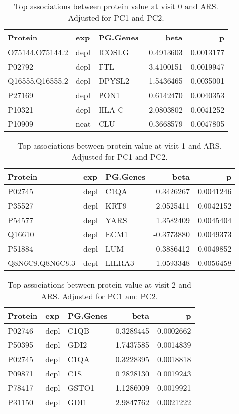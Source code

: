 \documentclass[
]{article}
\begin{document}
\begin{table}

\caption{\label{tab:v0}Top associations between protein value at visit 0 and ARS. Adjusted for PC1 and PC2.}
\centering
\begin{tabular}[t]{l|l|l|r|r}
\hline
Protein & exp & PG.Genes & beta & p\\
\hline
O75144.O75144.2 & depl & ICOSLG & 0.4913603 & 0.0013177\\
\hline
P02792 & depl & FTL & 3.4100151 & 0.0019947\\
\hline
Q16555.Q16555.2 & depl & DPYSL2 & -1.5436465 & 0.0035001\\
\hline
P27169 & depl & PON1 & 0.6142470 & 0.0040353\\
\hline
P10321 & depl & HLA-C & 2.0803802 & 0.0041252\\
\hline
P10909 & neat & CLU & 0.3668579 & 0.0047805\\
\hline
\end{tabular}
\end{table}
\begin{table}

\caption{\label{tab:v1}Top associations between protein value at visit 1 and ARS. Adjusted for PC1 and PC2.}
\centering
\begin{tabular}[t]{l|l|l|r|r}
\hline
Protein & exp & PG.Genes & beta & p\\
\hline
P02745 & depl & C1QA & 0.3426267 & 0.0041246\\
\hline
P35527 & depl & KRT9 & 2.0525411 & 0.0042152\\
\hline
P54577 & depl & YARS & 1.3582409 & 0.0045404\\
\hline
Q16610 & depl & ECM1 & -0.3773880 & 0.0049373\\
\hline
P51884 & depl & LUM & -0.3886412 & 0.0049852\\
\hline
Q8N6C8.Q8N6C8.3 & depl & LILRA3 & 1.0593348 & 0.0056458\\
\hline
\end{tabular}
\end{table}
\begin{table}

\caption{\label{tab:v2}Top associations between protein value at visit 2 and ARS. Adjusted for PC1 and PC2.}
\centering
\begin{tabular}[t]{l|l|l|r|r}
\hline
Protein & exp & PG.Genes & beta & p\\
\hline
P02746 & depl & C1QB & 0.3289445 & 0.0002662\\
\hline
P50395 & depl & GDI2 & 1.7437585 & 0.0014839\\
\hline
P02745 & depl & C1QA & 0.3228395 & 0.0018818\\
\hline
P09871 & depl & C1S & 0.2828130 & 0.0019243\\
\hline
P78417 & depl & GSTO1 & 1.1286009 & 0.0019921\\
\hline
P31150 & depl & GDI1 & 2.9847762 & 0.0021222\\
\hline
\end{tabular}
\end{table}
\end{document}

